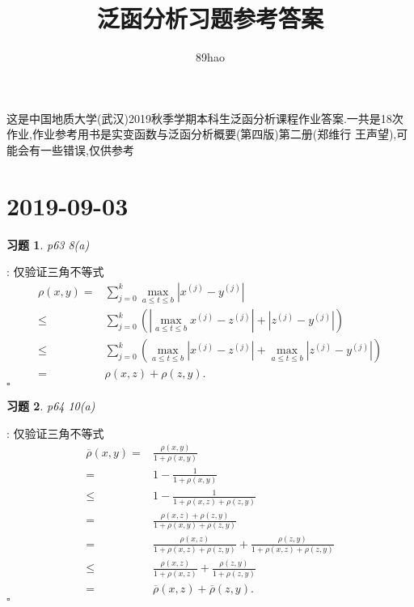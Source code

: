 \documentclass[a4paper]{article}
\newtheorem*{exe}{习题}
\newenvironment{sol}{{\noindent\bfseries 解}:}{\hfill $\square$\par}
\begin{document}
\title{泛函分析习题参考答案}
\author{89hao}
\maketitle
{这是中国地质大学(武汉)2019秋季学期本科生泛函分析课程作业答案.一共是18次作业,作业参考用书是实变函数与泛函分析概要(第四版)第二册(郑维行 王声望),可能会有一些错误,仅供参考}
\tableofcontents
\section{2019-09-03}
\begin{exe}
  p63 8(a)
\end{exe}
\begin{sol}
   仅验证三角不等式
  \begin{align*}
    \rho(x,y)=&\sum_{j=0}^{k} \max_{a\le t\le b}\left| x^{(j)}-y^{(j)} \right| \\
    \le & \sum_{j=0}^{k} \left(\left|\max_{a\le t\le b}x^{(j)}-z^{(j)}\right|+\left| z^{(j)}-y^{(j)} \right| \right)\\
    \le & \sum_{j=0}^{k} \left( \max_{a\le t\le b}\left| x^{(j)}-z^{(j)} \right| +\max_{a\le t\le b}\left| z^{(j)}-y^{(j)} \right|  \right) \\
    =& \rho(x,z)+\rho(z,y)
  .\end{align*}
\end{sol}
\begin{exe}
  p64 10(a)
\end{exe}
\begin{sol}
 仅验证三角不等式
\begin{align*}
  \overline{\rho}(x,y)=&\frac{\rho(x,y)}{1+\rho(x,y)}\\
  =&1-\frac{1}{1+\rho(x,y)}\\
  \le &1-\frac{1}{1+\rho(x,z)+\rho(z,y)}\\
  =& \frac{\rho(x,z)+\rho(z,y)}{1+\rho(x,y)+\rho(z,y)}\\
  =&\frac{\rho(x,z)}{1+\rho(x,z)+\rho(z,y)}+\frac{\rho(z,y)}{1+\rho(x,z)+\rho(z,y)}\\
  \le&  \frac{\rho(x,z)}{1+\rho(x,z)}+\frac{\rho(z,y)}{1+\rho(z,y)}\\
  =&\overline{\rho}(x,z)+\overline{\rho}(z,y)
.\end{align*}
\end{sol}
\end{document}
